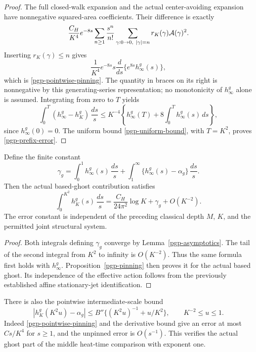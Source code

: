 \begin{proof}
The full closed-walk expansion and the actual
center-avoiding expansion have nonnegative squared-area
coefficients. Their difference is exactly
\[
 \frac{C_H}{K^4}e^{-8s}
   \sum_{n\ge1}\frac{s^n}{n!}
       \sum_{\gamma:0\to0,\ |\gamma|=n}
                         r_K(\gamma){\cal A}(\gamma)^2 .
\]
Inserting \(r_K(\gamma)\le n\) gives
\[
 \frac1{K^4}e^{-8s}
           s\frac{d}{ds}\{e^{8s}h_\infty^g(s)\},
\]
which is \eqref{pgp-pointwise-pinning}. The quantity
in braces on its right is nonnegative by this
generating-series representation; no monotonicity
of \(h_\infty^g\) alone is assumed.
Integrating from zero to \(T\) yields
\[
 \int_0^T(h_\infty^g-h_K^g)\,\frac{ds}{s}
 \le K^{-4}\left\{h_\infty^g(T)
                       +8\int_0^T h_\infty^g(s)\,ds\right\},
\]
since \(h_\infty^g(0)=0\).
The uniform bound \eqref{pgp-uniform-bound}, with
\(T=K^2\), proves \eqref{pgp-prefix-error}.
\end{proof}

\begin{theorem}
\label{pgp-prefix-theorem}
Define the finite constant
\[
 \gamma_g=\int_0^1 h_\infty^g(s)\,\frac{ds}{s}
       +\int_1^\infty\{h_\infty^g(s)-\alpha_g\}\,\frac{ds}{s}.
\]
Then the actual based-ghost contribution satisfies
\begin{equation}
 \boxed{\quad
 \int_0^{K^2}h_K^g(s)\,\frac{ds}{s}
     =\frac{C_H}{24\pi^2}\log K+\gamma_g+O(K^{-2}).
 \quad}
 \label{pgp-prefix-law}
\end{equation}
The error constant is independent of the preceding
classical depth \(M\), \(K\), and the permitted joint
structural system.
\end{theorem}

\begin{proof}
Both integrals defining \(\gamma_g\) converge by
Lemma~\ref{pgp-asymptotics}. The tail of the second
integral from \(K^2\) to infinity is \(O(K^{-2})\).
Thus the same formula first holds with \(h_\infty^g\).
Proposition~\ref{pgp-pinning} then proves it for the
actual based ghost. Its independence of the effective
action follows from the previously established
affine stationary-jet identification.
\end{proof}

There is also the pointwise intermediate-scale bound
\begin{equation}
 \left|h_K^g(K^2u)-\alpha_g\right|
 \le B''\{(K^2u)^{-1}+u/K^2\},
                         \qquad K^{-2}\le u\le1.
 \label{pgp-band-bound}
\end{equation}
Indeed \eqref{pgp-pointwise-pinning} and the derivative
bound give an error at most \(Cs/K^4\) for \(s\ge1\),
and the unpinned error is \(O(s^{-1})\).
This verifies the actual ghost part of the middle
heat-time comparison with exponent one.

